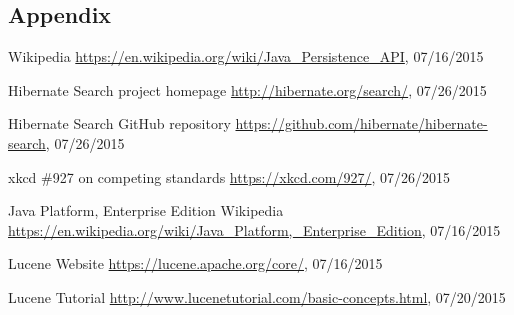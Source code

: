 \subsection*{Appendix}\label{appendix}

%
%
\begin{thebibliography}{99}
	Wikipedia
	\url{https://en.wikipedia.org/wiki/Java_Persistence_API}, 07/16/2015
	
	Hibernate Search project homepage
	\url{http://hibernate.org/search/}, 07/26/2015
	
	Hibernate Search GitHub repository
	\url{https://github.com/hibernate/hibernate-search}, 07/26/2015
	
	xkcd \#927 on competing standards
	\url{https://xkcd.com/927/}, 07/26/2015
	
	Java Platform, Enterprise Edition
	Wikipedia
	\url{https://en.wikipedia.org/wiki/Java_Platform,_Enterprise_Edition}, 07/16/2015
	
	Lucene Website
	\url{https://lucene.apache.org/core/}, 07/16/2015
	
	Lucene Tutorial
	\url{http://www.lucenetutorial.com/basic-concepts.html}, 07/20/2015
	
	
\end{thebibliography}